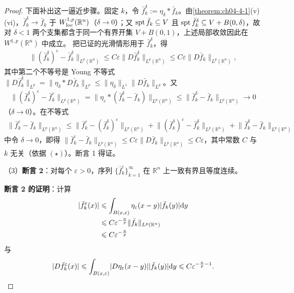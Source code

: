 ﻿\documentclass[../../main.tex]{subfiles}%
\begin{document}
\begin{proof}
下面补出这一逼近步骤。固定 $k$，令 $\bar f_k^\delta:=\eta_\delta*\bar f_k$。由\cref{theorem:ch04-4-1}(v)(vi)，$\bar f_k^\delta\to\bar f_k$ 于 $W^{1,p}_{\mathrm{loc}}(\mathbb{R}^n)$（$\delta\to0$）；又 $\operatorname{spt}\bar f_k\subseteq V$ 且 $\operatorname{spt}\bar f_k^\delta\subseteq V+B(0,\delta)$，故对 $\delta<1$ 两个支集都含于同一个有界开集 $V+B(0,1)$，上述局部收敛因此在 $W^{1,p}(\mathbb{R}^n)$ 中成立。%
把已证的光滑情形用于 $\bar f_k^\delta$，得
\begin{align*}
\lVert(\bar f_k^\delta)^\varepsilon-\bar f_k^\delta\rVert_{L^p(\mathbb{R}^n)}\leqslant C\varepsilon\lVert D\bar f_k^\delta\rVert_{L^p(\mathbb{R}^n)}\leqslant C\varepsilon\lVert D\bar f_k\rVert_{L^p(\mathbb{R}^n)},
\end{align*}
其中第二个不等号是 Young 不等式 $\lVert D\bar f_k^\delta\rVert_{L^p}=\lVert\eta_\delta*D\bar f_k\rVert_{L^p}\leqslant\lVert\eta_\delta\rVert_{L^1}\lVert D\bar f_k\rVert_{L^p}$。又
\begin{align*}
\lVert(\bar f_k^\delta)^\varepsilon-\bar f_k^\varepsilon\rVert_{L^p(\mathbb{R}^n)}=\lVert\eta_\varepsilon*(\bar f_k^\delta-\bar f_k)\rVert_{L^p(\mathbb{R}^n)}\leqslant\lVert\bar f_k^\delta-\bar f_k\rVert_{L^p(\mathbb{R}^n)}\to0
\end{align*}
（$\delta\to0$）。在不等式
\begin{align*}
\lVert\bar f_k^\varepsilon-\bar f_k\rVert_{L^p(\mathbb{R}^n)}\leqslant\lVert\bar f_k^\varepsilon-(\bar f_k^\delta)^\varepsilon\rVert_{L^p(\mathbb{R}^n)}+\lVert(\bar f_k^\delta)^\varepsilon-\bar f_k^\delta\rVert_{L^p(\mathbb{R}^n)}+\lVert\bar f_k^\delta-\bar f_k\rVert_{L^p(\mathbb{R}^n)}
\end{align*}
中令 $\delta\to0$，即得 $\lVert\bar f_k^\varepsilon-\bar f_k\rVert_{L^p(\mathbb{R}^n)}\leqslant C\varepsilon\lVert D\bar f_k\rVert_{L^p(\mathbb{R}^n)}\leqslant C\varepsilon$，其中常数 $C$ 与 $k$ 无关（依据 $(\star)$）。断言 1 得证。

（3）\textbf{断言 2}：对每个 $\varepsilon>0$，序列 $\{\bar f_k^\varepsilon\}_{k=1}^{\infty}$ 在 $\mathbb{R}^n$ 上一致有界且等度连续。

\textbf{断言 2 的证明}：计算
\begin{align*}
\lvert\bar f_k^\varepsilon(x)\rvert
&\leqslant\int_{B(x,\varepsilon)}\eta_\varepsilon(x-y)\lvert\bar f_k(y)\rvert\mathrm{d} y\\
&\leqslant C\varepsilon^{-\frac np}\lVert\bar f_k\rVert_{L^p(\mathbb{R}^n)}\\
&\leqslant C\varepsilon^{-\frac np}
\end{align*}
与
\begin{align*}
\lvert D\bar f_k^\varepsilon(x)\rvert\leqslant\int_{B(x,\varepsilon)}\lvert D\eta_\varepsilon(x-y)\rvert\lvert\bar f_k(y)\rvert\mathrm{d} y\leqslant C\varepsilon^{-\frac np-1}.
\end{align*}


\end{proof}
\end{document}
